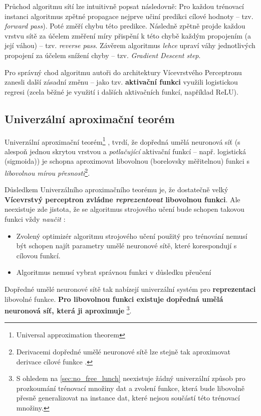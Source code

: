 Průchod algoritmu sítí lze intuitivně popsat následovně: Pro každou trénovací instanci algoritmus zpětné propagace nejprve učiní predikci cílové hodnoty – tzv. \emph{forward pass}).
Poté změří chybu této predikce. Následně zpětně projde každou vrstvu sítě za účelem změření míry přispění k této chybě každým propojením (a její váhou) – tzv. \emph{reverse pass}.
Závěrem algoritmus \emph{lehce} upraví váhy jednotlivých propojení za účelem snížení chyby – tzv. \emph{Gradient Descent step}. \cite{Geron2019}

Pro správný chod algoritmu autoři \cite{Rumelhart1987} do architektury Vícevrstvého Perceptronu zanesli další zásadní změnu – jako tzv. \textbf{aktivační funkci} využili logistickou regresi (zcela běžné je využití i dalších aktivačních funkcí, například ReLU).

\subsection{Univerzální aproximační teorém}
\label{sec:universal_approximation_theorem}
Univerzální aproximační teorém\footnote{Universal approximation theorem} \cite{Hornik1989}, \cite{Cybenko1989} tvrdí, že dopředná umělá neuronová síť (s alespoň jednou skrytou vrstvou a \emph{potlačující} aktivační funkcí – např. logistická (sigmoida)) je schopna aproximovat libovolnou (borelovsky měřitelnou) funkci s \emph{libovolnou mírou přesnosti}\footnote{Derivacemi dopředné umělé neuronové sítě lze stejně tak aproximovat derivace cílové funkce \cite{Hornik1990}.}.

Důsledkem Univerzálního aproximačního teorému je, že dostatečně velký \textbf{Vícevrstvý perceptron zvládne \emph{reprezentovat} libovolnou funkci}.
Ale neexistuje zde jistota, že se algoritmus strojového učení bude schopen takovou funkci vždy \emph{naučit}  \cite{Goodfellow2016}:

\begin{itemize}
    \item Zvolený optimizér algoritmu strojového učení použitý pro trénování nemusí být schopen najít parametry umělé neuronové sítě, které korespondují s cílovou funkcí.
    \item Algoritmus nemusí vybrat správnou funkci v důsledku přeučení
\end{itemize}

Dopředné umělé neuronové sítě tak nabízejí univerzální systém pro \textbf{reprezentaci} libovolné funkce. \textbf{Pro libovolnou funkci existuje dopředná umělá neuronová síť, která ji aproximuje}
\footnote{S ohledem na \autoref{sec:no_free_lunch} neexistuje žádný univerzální způsob pro prozkoumání trénovací množiny dat a zvolení funkce, která bude libovolně přesně generalizovat na instance dat, které nejsou součástí této trénovací množiny.}.